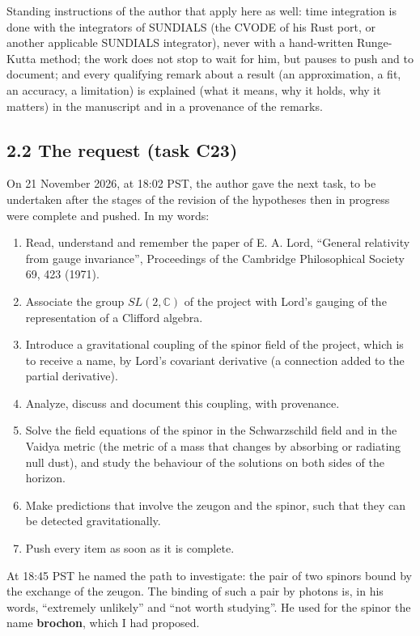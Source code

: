 \documentclass[
  10pt,
]{article}
\providecommand{\tightlist}{%
  \setlength{\itemsep}{0pt}\setlength{\parskip}{0pt}}
\begin{document}
Standing instructions of the author that apply here as well: time
integration is done with the integrators of SUNDIALS (the CVODE of his
Rust port, or another applicable SUNDIALS integrator), never with a
hand-written Runge-Kutta method; the work does not stop to wait for him,
but pauses to push and to document; and every qualifying remark about a
result (an approximation, a fit, an accuracy, a limitation) is explained
(what it means, why it holds, why it matters) in the manuscript and in a
provenance of the remarks.

\hypertarget{the-request-task-c23}{%
\subsection{2.2 The request (task C23)}\label{the-request-task-c23}}

On 21 November 2026, at 18:02 PST, the author gave the next task, to be
undertaken after the stages of the revision of the hypotheses then in
progress were complete and pushed. In my words:

\begin{enumerate}
\def\labelenumi{\arabic{enumi}.}
\tightlist
\item
  Read, understand and remember the paper of E. A. Lord, ``General
  relativity from gauge invariance'', Proceedings of the Cambridge
  Philosophical Society 69, 423 (1971).
\item
  Associate the group \(SL(2,\mathbb C)\) of the project with Lord's
  gauging of the representation of a Clifford algebra.
\item
  Introduce a gravitational coupling of the spinor field of the project,
  which is to receive a name, by Lord's covariant derivative (a
  connection added to the partial derivative).
\item
  Analyze, discuss and document this coupling, with provenance.
\item
  Solve the field equations of the spinor in the Schwarzschild field and
  in the Vaidya metric (the metric of a mass that changes by absorbing
  or radiating null dust), and study the behaviour of the solutions on
  both sides of the horizon.
\item
  Make predictions that involve the zeugon and the spinor, such that
  they can be detected gravitationally.
\item
  Push every item as soon as it is complete.
\end{enumerate}

At 18:45 PST he named the path to investigate: the pair of two spinors
bound by the exchange of the zeugon. The binding of such a pair by
photons is, in his words, ``extremely unlikely'' and ``not worth
studying''. He used for the spinor the name \textbf{brochon}, which I
had proposed.
\end{document}

